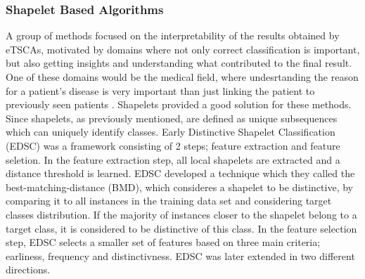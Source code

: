 \subsubsection{Shapelet Based Algorithms}
\label{SubsubsectionETSCAShapelets}
A group of methods \cite{xing2011extracting,ghalwash2012early,ghalwash2014utilizing,he2015early} focused on the interpretability of the results obtained by eTSCAs,
motivated by domains where not only correct classification is important, but also getting insights and understanding what contributed to the final result.
One of these domains would be the medical field, where undesrtanding the reason for a patient's disease is very important than just linking the patient to previously seen patients \cite{xing2011extracting}.
Shapelets provided a good solution for these methods. Since shapelets, as previously mentioned, are defined as unique subsequences which can uniquely identify classes.
Early Distinctive Shapelet Classification (EDSC) was a framework consisting of 2 steps; feature extraction and feature seletion.
In the feature extraction step, all local shapelets are extracted and a distance threshold is learned. EDSC developed a technique which they called the best-matching-distance (BMD),
which consideres a shapelet to be distinctive, by comparing it to all instances in the training data set and considering target classes distribution.
If the majority of instances closer to the shapelet belong to a target class, it is considered to be distinctive of this class.
In the feature selection step, EDSC selects a smaller set of features based on three main criteria; earliness, frequency and distinctivness.
EDSC was later extended in two different directions.

